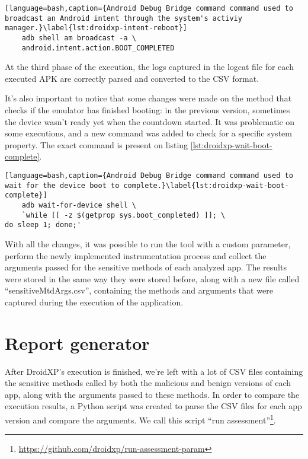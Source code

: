 \begin{lstlisting}[language=bash,caption={Android Debug Bridge command command used to broadcast an Android intent through the system's activiy manager.}\label{lst:droidxp-intent-reboot}]
    adb shell am broadcast -a \
    android.intent.action.BOOT_COMPLETED
\end{lstlisting}

At the third phase of the execution, the logs captured in the logcat file for each executed APK are correctly parsed and converted to the CSV format.

It's also important to notice that some changes were made on the method that checks if the emulator has finished booting: in the previous version, sometimes the device wasn't ready yet when the countdown started. It was problematic on some executions, and a new command was added to check for a specific system property. The exact command is present on listing \ref{lst:droidxp-wait-boot-complete}.

\begin{lstlisting}[language=bash,caption={Android Debug Bridge command command used to wait for the device boot to complete.}\label{lst:droidxp-wait-boot-complete}]
    adb wait-for-device shell \
    `while [[ -z $(getprop sys.boot_completed) ]]; \
do sleep 1; done;'
\end{lstlisting}

With all the changes, it was possible to run the tool with a custom parameter, perform the newly implemented instrumentation process and collect the arguments passed for the sensitive methods of each analyzed app. The results were stored in the same way they were stored before, along with a new file called ``sensitiveMtdArgs.csv'', containing the methods and arguments that were captured during the execution of the application.

\section{Report generator}

After DroidXP's execution is finished, we're left with a lot of CSV files containing the sensitive methods called by both the malicious and benign versions of each app, along with the arguments passed to these methods. In order to compare the execution results, a Python script was created to parse the CSV files for each app version and compare the arguments. We call this script ``run assessment''\footnote{\url{https://github.com/droidxp/run-assessment-param}}.

